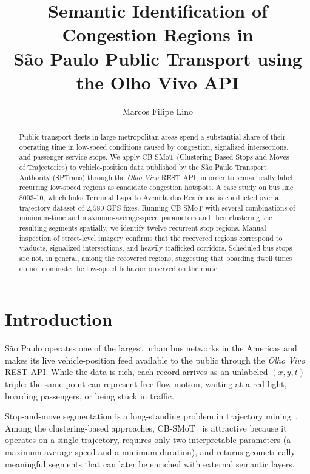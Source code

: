 \documentclass[11pt,a4paper]{article}
\title{Semantic Identification of Congestion Regions in\\
       São Paulo Public Transport using the Olho Vivo API}
\author{Marcos Filipe Lino}
\date{}
\begin{document}
\maketitle

\begin{abstract}
Public transport fleets in large metropolitan areas spend a substantial
share of their operating time in low-speed conditions caused by
congestion, signalized intersections, and passenger-service stops. We
apply CB-SMoT (Clustering-Based Stops and Moves of Trajectories) to
vehicle-position data published by the São Paulo Transport Authority
(SPTrans) through the \emph{Olho Vivo} REST API, in order to
semantically label recurring low-speed regions as candidate congestion
hotspots. A case study on bus line 8003-10, which links Terminal Lapa to
Avenida dos Remédios, is conducted over a trajectory dataset of
$2{,}580$ GPS fixes. Running CB-SMoT with several combinations of
minimum-time and maximum-average-speed parameters and then clustering
the resulting segments spatially, we identify twelve
recurrent stop regions. Manual inspection of street-level imagery
confirms that the recovered regions correspond to viaducts, signalized
intersections, and heavily trafficked corridors. Scheduled bus stops are
not, in general, among the recovered regions, suggesting that boarding
dwell times do not dominate the low-speed behavior observed on the
route.
\end{abstract}

\section{Introduction}
\label{sec:introduction}

São Paulo operates one of the largest urban bus networks in the Americas
and makes its live vehicle-position feed available to the public through
the \emph{Olho Vivo} REST API. While the data is rich, each record
arrives as an unlabeled $(x,y,t)$ triple: the same point can represent
free-flow motion, waiting at a red light, boarding passengers, or being
stuck in traffic.

Stop-and-move segmentation is a long-standing problem in trajectory
mining~\cite{alvares2007}. Among the clustering-based approaches,
CB-SMoT~\cite{palma2008} is attractive because it operates on a single
trajectory, requires only two interpretable parameters (a maximum
average speed and a minimum duration), and returns geometrically
meaningful segments that can later be enriched with external semantic
layers.
\end{document}
